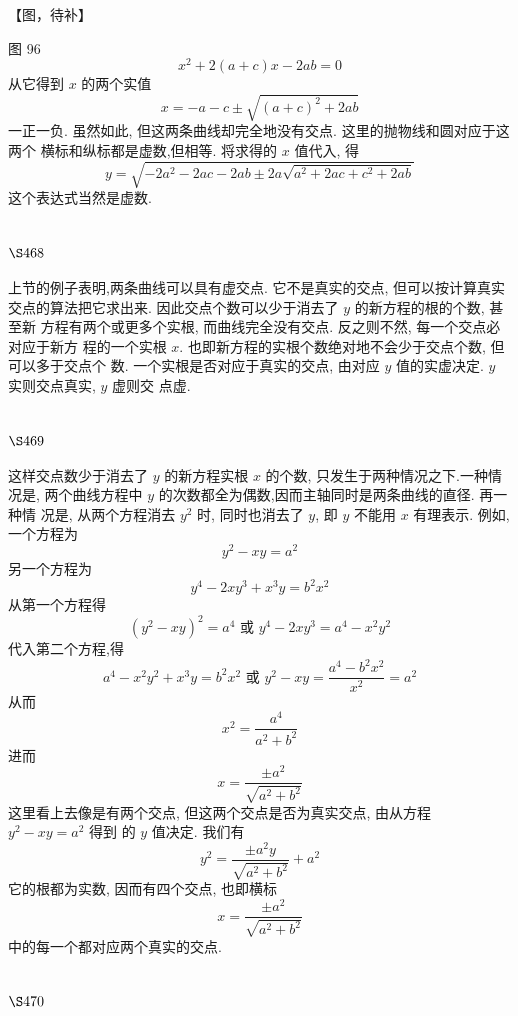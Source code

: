 【图，待补】

图 96
\[
x^{2}+2(a+c) x-2 a b=0
\]
从它得到 $x$ 的两个实值
\[
x=-a-c \pm \sqrt{(a+c)^{2}+2 a b}
\]
一正一负. 虽然如此, 但这两条曲线却完全地没有交点. 这里的抛物线和圆对应于这两个 横标和纵标都是虚数,但相等. 将求得的 $x$ 值代入, 得
\[
y=\sqrt{-2 a^{2}-2 a c-2 a b \pm 2 a \sqrt{a^{2}+2 a c+c^{2}+2 a b}}
\]
这个表达式当然是虚数.

\section{$\S 468$}

上节的例子表明,两条曲线可以具有虚交点. 它不是真实的交点, 但可以按计算真实 交点的算法把它求出来. 因此交点个数可以少于消去了 $y$ 的新方程的根的个数, 甚至新 方程有两个或更多个实根, 而曲线完全没有交点. 反之则不然, 每一个交点必对应于新方 程的一个实根 $x$. 也即新方程的实根个数绝对地不会少于交点个数, 但可以多于交点个 数. 一个实根是否对应于真实的交点, 由对应 $y$ 值的实虚决定. $y$ 实则交点真实, $y$ 虚则交 点虚.

\section{$\S 469$}

这样交点数少于消去了 $y$ 的新方程实根 $x$ 的个数, 只发生于两种情况之下.一种情 况是, 两个曲线方程中 $y$ 的次数都全为偶数,因而主轴同时是两条曲线的直径. 再一种情 况是, 从两个方程消去 $y^{2}$ 时, 同时也消去了 $y$, 即 $y$ 不能用 $x$ 有理表示. 例如, 一个方程为
\[
y^{2}-x y=a^{2}
\]
另一个方程为
\[
y^{4}-2 x y^{3}+x^{3} y=b^{2} x^{2}
\]
从第一个方程得
\[
\left(y^{2}-x y\right)^{2}=a^{4} \text { 或 } y^{4}-2 x y^{3}=a^{4}-x^{2} y^{2}
\]
代入第二个方程,得
\[
a^{4}-x^{2} y^{2}+x^{3} y=b^{2} x^{2} \text { 或 } y^{2}-x y=\frac{a^{4}-b^{2} x^{2}}{x^{2}}=a^{2}
\]
从而
\[
x^{2}=\frac{a^{4}}{a^{2}+b^{2}}
\]
进而
\[
x=\frac{\pm a^{2}}{\sqrt{a^{2}+b^{2}}}
\]
这里看上去像是有两个交点, 但这两个交点是否为真实交点, 由从方程 $y^{2}-x y=a^{2}$ 得到 的 $y$ 值决定. 我们有
\[
y^{2}=\frac{\pm a^{2} y}{\sqrt{a^{2}+b^{2}}}+a^{2}
\]
它的根都为实数, 因而有四个交点, 也即横标
\[
x=\frac{\pm a^{2}}{\sqrt{a^{2}+b^{2}}}
\]
中的每一个都对应两个真实的交点.

\section{$\S 470$}

